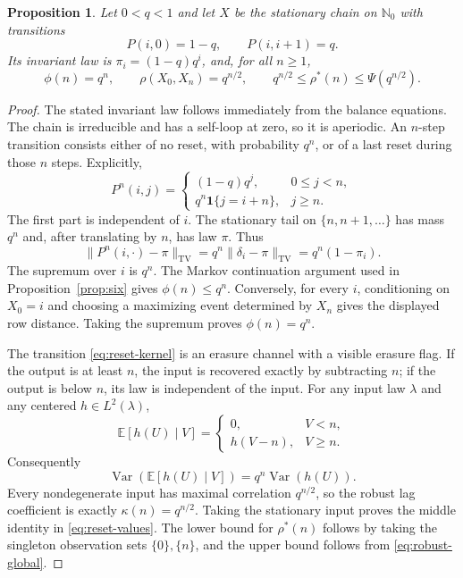 \documentclass[11pt]{amsart}
\numberwithin{equation}{section}
\newtheorem{proposition}[theorem]{Proposition}
\theoremstyle{definition}
\newcommand{\EE}{\mathbb E}
\newcommand{\NN}{\mathbb N}
\newcommand{\TV}{\mathrm{TV}}
\newcommand{\Var}{\operatorname{Var}}
\newcommand{\rhostar}{\rho^{*}}
\newcommand{\ind}{\mathbf 1}
\begin{document}
\begin{proposition}\label{prop:reset}
Let $0<q<1$ and let $X$ be the stationary chain on $\NN_0$ with transitions
\[
P(i,0)=1-q,\qquad P(i,i+1)=q.
\]
Its invariant law is $\pi_i=(1-q)q^i$, and, for all $n\ge1$,
\begin{equation}\label{eq:reset-values}
\phi(n)=q^n,\qquad \rho(X_0,X_n)=q^{n/2},\qquad
q^{n/2}\le\rhostar(n)\le\Psi(q^{n/2}).
\end{equation}
\end{proposition}

\begin{proof}
The stated invariant law follows immediately from the balance equations. The chain is irreducible and has a self-loop at zero, so it is aperiodic. An $n$-step transition consists either of no reset, with probability $q^n$, or of a last reset during those $n$ steps. Explicitly,
\begin{equation}\label{eq:reset-kernel}
P^n(i,j)=
\begin{cases}
(1-q)q^j,&0\le j<n,\\
q^n\ind\{j=i+n\},&j\ge n.
\end{cases}
\end{equation}
The first part is independent of $i$. The stationary tail on $\{n,n+1,\ldots\}$ has mass $q^n$ and, after translating by $n$, has law $\pi$. Thus
\[
\|P^n(i,\cdot)-\pi\|_{\TV}=q^n\|\delta_i-\pi\|_{\TV}
=q^n(1-\pi_i).
\]
The supremum over $i$ is $q^n$. The Markov continuation argument used in Proposition~\ref{prop:six} gives $\phi(n)\le q^n$. Conversely, for every $i$, conditioning on $X_0=i$ and choosing a maximizing event determined by $X_n$ gives the displayed row distance. Taking the supremum proves $\phi(n)=q^n$.

The transition \eqref{eq:reset-kernel} is an erasure channel with a visible erasure flag. If the output is at least $n$, the input is recovered exactly by subtracting $n$; if the output is below $n$, its law is independent of the input. For any input law $\lambda$ and any centered $h\in L^2(\lambda)$,
\[
\EE[h(U)\mid V]=
\begin{cases}
0,&V<n,\\
h(V-n),&V\ge n.
\end{cases}
\]
Consequently
\[
\Var(\EE[h(U)\mid V])=q^n\Var(h(U)).
\]
Every nondegenerate input has maximal correlation $q^{n/2}$, so the robust lag coefficient is exactly $\kappa(n)=q^{n/2}$. Taking the stationary input proves the middle identity in \eqref{eq:reset-values}. The lower bound for $\rhostar(n)$ follows by taking the singleton observation sets $\{0\},\{n\}$, and the upper bound follows from \eqref{eq:robust-global}.
\end{proof}
\end{document}
